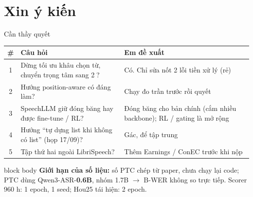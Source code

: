 \documentclass[aspectratio=169,xcolor=table]{beamer}
\newcommand{\ra}{$\rightarrow$}
\begin{document}
\section{Xin ý kiến}
\begin{frame}{Cần thầy quyết}
\centering\small
\begin{tabular}{c p{6.4cm} p{6.0cm}}
\toprule
\# & Câu hỏi & Em đề xuất\\
\midrule
1 & Dừng tối ưu khâu chọn từ, chuyển trọng tâm sang \textcircled{\scriptsize 2}? & Có. Chỉ sửa nốt 2 lỗi tiền xử lý (rẻ)\\
2 & Hướng position-aware có đáng làm? & Chạy đo trần trước rồi quyết\\
3 & SpeechLLM giữ đóng băng hay được fine-tune / RL? & Đóng băng cho bản chính (cắm nhiều backbone); RL / gating là mở rộng\\
4 & Hướng ``tự dựng list khi không có list'' (họp 17/09)? & Gác, để tập trung\\
5 & Tập thứ hai ngoài LibriSpeech? & Thêm Earnings / ConEC trước khi nộp\\
\bottomrule
\end{tabular}
\raggedright\vspace{0.4cm}

\begin{beamercolorbox}[sep=0.45em,rounded=true]{block body}
\small\textbf{Giới hạn của số liệu:} số PTC chép từ paper, chưa chạy lại code; PTC dùng Qwen3-ASR-\textbf{0.6B}, nhóm 1.7B \ra{} B-WER không so trực tiếp. Scorer 960 h: 1 epoch, 1 seed; Hou25 tái hiện: 2 epoch.
\end{beamercolorbox}
\end{frame}
\end{document}
